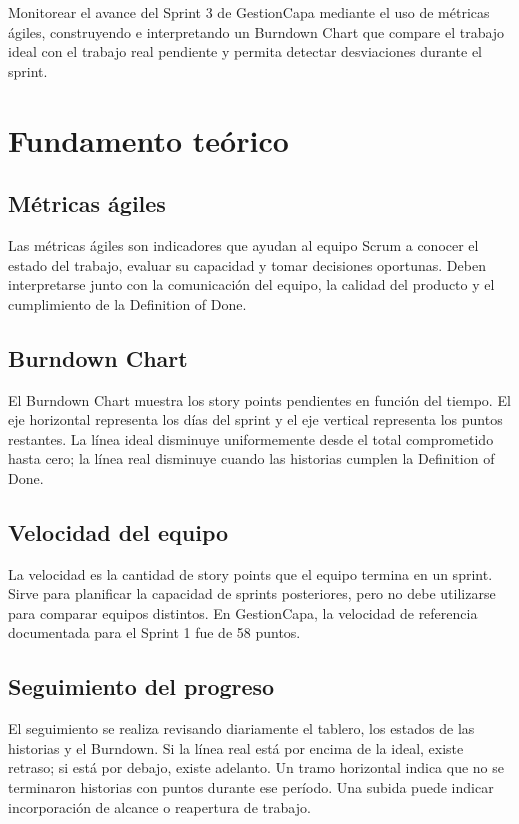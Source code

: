 \documentclass[12pt,a4paper]{article}
\begin{document}
Monitorear el avance del Sprint 3 de GestionCapa mediante el uso de métricas
ágiles, construyendo e interpretando un Burndown Chart que compare el trabajo
ideal con el trabajo real pendiente y permita detectar desviaciones durante el
sprint.

\section{Fundamento teórico}

\subsection{Métricas ágiles}

Las métricas ágiles son indicadores que ayudan al equipo Scrum a conocer el
estado del trabajo, evaluar su capacidad y tomar decisiones oportunas. Deben
interpretarse junto con la comunicación del equipo, la calidad del producto y
el cumplimiento de la Definition of Done.

\subsection{Burndown Chart}

El Burndown Chart muestra los story points pendientes en función del tiempo.
El eje horizontal representa los días del sprint y el eje vertical representa
los puntos restantes. La línea ideal disminuye uniformemente desde el total
comprometido hasta cero; la línea real disminuye cuando las historias cumplen
la Definition of Done.

\subsection{Velocidad del equipo}

La velocidad es la cantidad de story points que el equipo termina en un
sprint. Sirve para planificar la capacidad de sprints posteriores, pero no
debe utilizarse para comparar equipos distintos. En GestionCapa, la velocidad
de referencia documentada para el Sprint 1 fue de 58 puntos.

\subsection{Seguimiento del progreso}

El seguimiento se realiza revisando diariamente el tablero, los estados de
las historias y el Burndown. Si la línea real está por encima de la ideal,
existe retraso; si está por debajo, existe adelanto. Un tramo horizontal
indica que no se terminaron historias con puntos durante ese período. Una
subida puede indicar incorporación de alcance o reapertura de trabajo.
\end{document}
